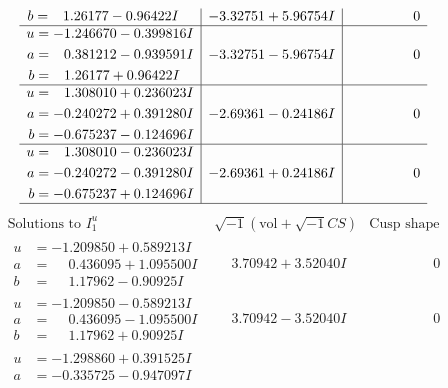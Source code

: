 \documentclass[1p]{elsarticle_modified}
\theoremstyle{definition}
\newcommand{\I}{\sqrt{-1}}
\begin{document}
$$\begin{array}{c|c|c}
\begin{aligned}
b &= \phantom{-}1.26177 - 0.96422 I\end{aligned}
 & -3.32751 + 5.96754 I & \phantom{-0.000000 } 0 \\ \hline\begin{aligned}
u &= -1.246670 - 0.399816 I \\
a &= \phantom{-}0.381212 - 0.939591 I \\
b &= \phantom{-}1.26177 + 0.96422 I\end{aligned}
 & -3.32751 - 5.96754 I & \phantom{-0.000000 } 0 \\ \hline\begin{aligned}
u &= \phantom{-}1.308010 + 0.236023 I \\
a &= -0.240272 + 0.391280 I \\
b &= -0.675237 - 0.124696 I\end{aligned}
 & -2.69361 - 0.24186 I & \phantom{-0.000000 } 0 \\ \hline\begin{aligned}
u &= \phantom{-}1.308010 - 0.236023 I \\
a &= -0.240272 - 0.391280 I \\
b &= -0.675237 + 0.124696 I\end{aligned}
 & -2.69361 + 0.24186 I & \phantom{-0.000000 } 0\\
 \hline 
 \end{array}$$\newpage$$\begin{array}{c|c|c}  
\text{Solutions to }I^u_{1}& \I (\text{vol} + \sqrt{-1}CS) & \text{Cusp shape}\\
 \hline 
\begin{aligned}
u &= -1.209850 + 0.589213 I \\
a &= \phantom{-}0.436095 + 1.095500 I \\
b &= \phantom{-}1.17962 - 0.90925 I\end{aligned}
 & \phantom{-}3.70942 + 3.52040 I & \phantom{-0.000000 } 0 \\ \hline\begin{aligned}
u &= -1.209850 - 0.589213 I \\
a &= \phantom{-}0.436095 - 1.095500 I \\
b &= \phantom{-}1.17962 + 0.90925 I\end{aligned}
 & \phantom{-}3.70942 - 3.52040 I & \phantom{-0.000000 } 0 \\ \hline\begin{aligned}
u &= -1.298860 + 0.391525 I \\
a &= -0.335725 - 0.947097 I \\

\end{aligned}
\end{array}$$
\end{document}
